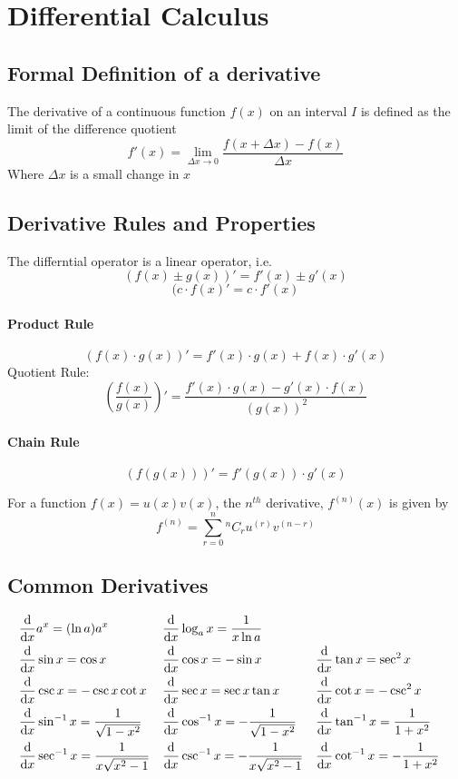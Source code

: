 \section{Differential Calculus}
\subsection{Formal Definition of a derivative}
\begin{defn}
	The derivative of a continuous function $f(x)$ on an interval $I$ is defined as the limit of the difference quotient
	$$f'(x) = \lim_{\Delta x \to 0}{\frac{f(x + \Delta x) - f(x)}{\Delta x}}$$
	Where $\Delta x$ is a small change in $x$
\end{defn}
\subsection{Derivative Rules and Properties}
The differntial operator is a linear operator, i.e.\,
$${(f(x) \pm g(x))}' = f'(x) \pm g'(x)$$
$${(c\cdot f(x)}' = c\cdot f'(x)$$
\paragraph{Product Rule}
$$(f(x)\cdot g(x))' = f'(x)\cdot g(x) + f(x)\cdot g'(x)$$
Quotient Rule:
$$\left(\frac{f(x)}{g(x)}\right)' = \frac{f'(x)\cdot g(x) - g'(x)\cdot f(x)}{(g(x))^2}$$
\paragraph{Chain Rule}
$$ (f(g(x)))' = f'(g(x))\cdot g'(x)$$
\begin{thrm}
	For a function $f(x) = u(x)v(x)$, the ${n^{th}}$ derivative, $f^{(n)}(x)$ is given by
	$$f^{(n)}= \sum_{r=0}^{n}{^nC_r u^{(r)}v^{(n-r)}}$$
\end{thrm}
\subsection{Common Derivatives}
\begin{align*}
&\frac{\mathrm{d}}{\mathrm{d}x}a^x = (\ln a)a^x & &\frac{\mathrm{d}}{\mathrm{d}x}\log_a x = \frac{1}{x\ln a} \\
&\frac{\mathrm{d}}{\mathrm{d}x}\sin x = \cos x & &\frac{\mathrm{d}}{\mathrm{d}x}\cos x = -\sin x & &\frac{\mathrm{d}}{\mathrm{d}x}\tan x = \sec^2 x\\
&\frac{\mathrm{d}}{\mathrm{d}x}\csc x = -\csc x \cot x & &\frac{\mathrm{d}}{\mathrm{d}x}\sec x = \sec x \tan x & &\frac{\mathrm{d}}{\mathrm{d}x}\cot x = -\csc^2 x \\
&\frac{\mathrm{d}}{\mathrm{d}x}\sin^{-1}x = \frac{1}{\sqrt{1 - x^2}} & &\frac{\mathrm{d}}{\mathrm{d}x}\cos^{-1}x = - \frac{1}{\sqrt{1 - x^2}} & &\frac{\mathrm{d}}{\mathrm{d}x}\tan^{-1}x = \frac{1}{1 + x^2} \\
&\frac{\mathrm{d}}{\mathrm{d}x}\sec^{-1}x = \frac{1}{ x \sqrt{x^2 - 1}} &  &\frac{\mathrm{d}}{\mathrm{d}x}\csc^{-1}x = -\frac{1}{ x \sqrt{x^2 - 1}} & &\frac{\mathrm{d}}{\mathrm{d}x}\cot^{-1}x = -\frac{1}{1 + x^2} \\
\end{align*}

